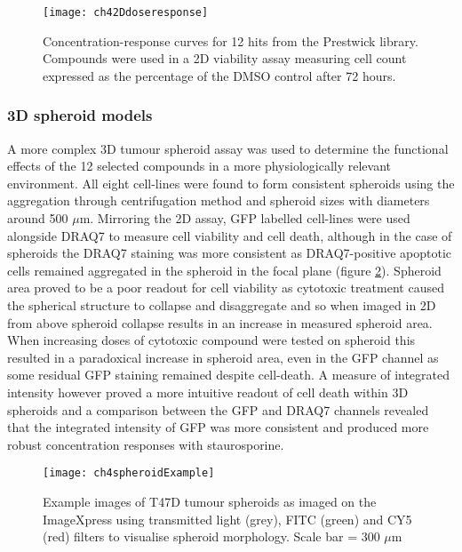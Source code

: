 \documentclass[a4paper,11pt,twoside,openright]{scrbook}
\begin{document}
\begin{figure}
    \texttt{[image: ch42Ddoseresponse]}
    \captionsetup{width=0.8\textwidth}
    \caption[Concentration-response curves for 12 hits from the Prestwick library in a 2D apoptosis assay.]{
        Concentration-response curves for 12 hits from the Prestwick library.
        Compounds were used in a 2D viability assay measuring cell count expressed as the percentage of the DMSO 
control after 72 hours.
    }
    \label{figure:2D_dose_response}
\end{figure}



\subsubsection{3D spheroid models}

A more complex 3D tumour spheroid assay was used to determine the functional effects of the 12 selected compounds in a 
more physiologically relevant environment.
All eight cell-lines were found to form consistent spheroids using the aggregation through centrifugation method and 
spheroid sizes with diameters around 500 $\mu$m.
Mirroring the 2D assay, GFP labelled cell-lines were used alongside DRAQ7 to measure cell viability and cell death, 
although in the case of spheroids the DRAQ7 staining was more consistent as DRAQ7-positive apoptotic cells remained 
aggregated in the spheroid in the focal plane (figure \ref{figure:spheroid_example}).
Spheroid area proved to be a poor readout for cell viability as cytotoxic treatment caused the spherical structure to 
collapse and disaggregate and so when imaged in 2D from above spheroid collapse results in an increase in measured 
spheroid area.
When increasing doses of cytotoxic compound were tested on spheroid this resulted in a paradoxical increase in spheroid 
area, even in the GFP channel as some residual GFP staining remained despite cell-death.
A measure of integrated intensity however proved a more intuitive readout of cell death within 3D spheroids and a 
comparison between the GFP and DRAQ7 channels revealed that the integrated intensity of GFP was more consistent and 
produced more robust concentration responses with staurosporine.

\begin{figure}
    \texttt{[image: ch4spheroidExample]}
    \captionsetup{width=0.8\textwidth}
    \caption[Example images of T47D tumour spheroids.]{Example images of T47D tumour spheroids as imaged on the 
ImageXpress using transmitted light (grey), FITC (green) and CY5 (red) filters to visualise spheroid morphology. Scale 
bar = 300 $\mu$m}
    \label{figure:spheroid_example}
\end{figure}
\end{document}
